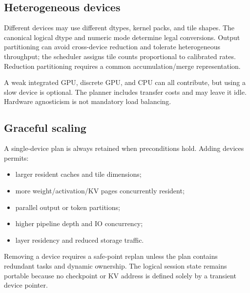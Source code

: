 \subsection{Heterogeneous devices}

Different devices may use different dtypes, kernel packs, and tile shapes. The canonical logical dtype and numeric mode determine legal conversions. Output partitioning can avoid cross-device reduction and tolerate heterogeneous throughput; the scheduler assigns tile counts proportional to calibrated rates. Reduction partitioning requires a common accumulation/merge representation.

A weak integrated GPU, discrete GPU, and CPU can all contribute, but using a slow device is optional. The planner includes transfer costs and may leave it idle. Hardware agnosticism is not mandatory load balancing.

\subsection{Graceful scaling}

A single-device plan is always retained when preconditions hold. Adding devices permits:

\begin{itemize}
  \item larger resident caches and tile dimensions;
  \item more weight/activation/KV pages concurrently resident;
  \item parallel output or token partitions;
  \item higher pipeline depth and IO concurrency;
  \item layer residency and reduced storage traffic.
\end{itemize}

Removing a device requires a safe-point replan unless the plan contains redundant tasks and dynamic ownership. The logical session state remains portable because no checkpoint or KV address is defined solely by a transient device pointer.
